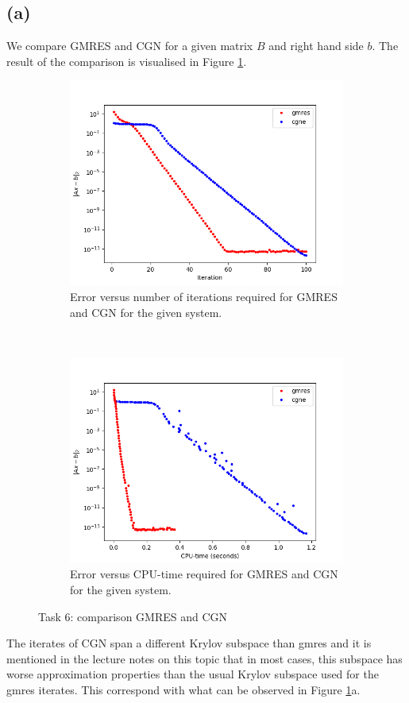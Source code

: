 \subsection*{(a)}
We compare GMRES and CGN for a given matrix $B$ and right hand side $b$. The result of the comparison is visualised in Figure \ref{task6}.
\begin{figure}[h!]
	\centering
	\begin{subfigure}[t]{0.49\textwidth}
		\includegraphics[width=\textwidth]{error_itr.png}
		\caption{Error versus number of iterations required for GMRES and CGN for the given system.}
	\end{subfigure}~
	\begin{subfigure}[t]{0.49\textwidth}
		\includegraphics[width=\textwidth]{error_time.png}	
		\caption{Error versus CPU-time required for GMRES and CGN for the given system.}
	\end{subfigure}
	\caption{Task 6: comparison GMRES and CGN}
	\label{task6}
\end{figure}
The iterates of CGN span a different Krylov subspace than gmres and it is mentioned in the lecture notes on this topic that in most cases, this subspace has worse approximation properties than the usual Krylov subspace used for the gmres iterates. This correspond with what can be observed in Figure \ref{task6}a.
